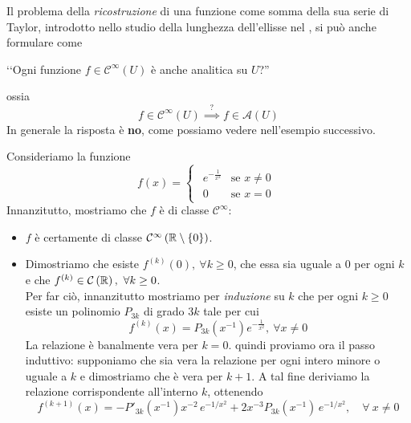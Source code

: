 Il problema della \textit{ricostruzione} di una funzione come somma della sua serie di Taylor, introdotto nello studio della lunghezza dell'ellisse nel , si può anche formulare come
\begin{center}
	‘‘Ogni funzione $f\in\mathcal{C}^{\infty}\left(U\right)$ è anche analitica su $U$?''
\end{center}
ossia
\begin{equation*}
	f\in\mathcal{C}^{\infty}\left(U\right)\stackrel{?}{\implies}f\in\mathcal{A}\left(U\right)
\end{equation*}
In generale la risposta è \textbf{no}, come possiamo vedere nell'esempio successivo.
\begin{examplewt}
Consideriamo la funzione
	\begin{equation*}
		f\left(x\right)=
		\begin{cases}
			\begin{array}{ll}
				e^{-\frac{1}{x^2}}&\text{se }x\neq 0\\
				0&\text{se }x=0
			\end{array}
		\end{cases}
	\end{equation*}
Innanzitutto, mostriamo che $f$ è di classe  $\mathcal{C}^{\infty}$:
\begin{itemize}
	\item $f$ è certamente di classe $\mathcal{C}^{\infty}\left(\mathbb{R}\setminus\left\{0\right\}\right)$.
	\item Dimostriamo che esiste $f^{\left(k\right)}\left(0\right),\ \forall k\geq 0$, che essa sia uguale a $0$ per ogni $k$ e che $f^{\left(k\right)}\in\mathcal{C}\left(\realset\right),\ \forall k\geq 0$.\\
	Per far ciò, innanzitutto mostriamo per \textit{induzione} su $k$ che per ogni $k\geq 0$ esiste un polinomio $P_{3k}$ di grado $3k$ tale per cui
	\begin{equation*}
		f^{(k)}\left(x\right)=P_{3k}\left(x^{-1}\right)e^{-\frac{1}{x^2}},\ \forall x\neq 0
	\end{equation*}
La relazione è banalmente vera per $k=0$. quindi proviamo ora il passo induttivo: supponiamo che sia vera la relazione per ogni intero minore o uguale a $k$ e dimostriamo che è vera per $k+1$. A tal fine deriviamo la relazione corrispondente all'interno $k$, ottenendo
\begin{equation*}
	f^{(k+1)}(x)=-P'_{3k}(x^{-1})x^{-2}\, e^{-1/x^2}+2x^{-3} P_{3k}(x^{-1})\, e^{-1/x^2},\quad \forall \ x\neq 0

\end{equation*}
\end{itemize}
\end{examplewt}
